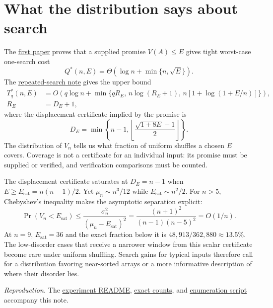 \documentclass[10pt,letterpaper]{article}
\begin{document}
\section*{What the distribution says about search}
The \href{../../disorder_potential_search_note_v2.pdf}{first paper} proves that
a supplied promise $V(A)\le E$ gives tight worst-case one-search cost
\[
 Q^*(n,E)=\Theta\!\left(\log n+\min\{n,\sqrt E\}\right).
\]
The \href{../../search-under-a-disorder-budget/search_under_a_disorder_budget.pdf}
{repeated-search note} gives the upper bound
\[
 \begin{aligned}
T_q^*(n,E)&=O\!\left(q\log n+
 \min\{qR_E,\,n\log(R_E+1),\,n[1+\log(1+E/n)]\}\right),\\
R_E&=D_E+1,
\end{aligned}
\]
where the displacement certificate implied by the promise is
\[
 D_E=\min\left\{n-1,
 \left\lfloor\frac{\sqrt{1+8E}-1}{2}\right\rfloor\right\}.
\]
The distribution of $V_n$ tells us what fraction of uniform shuffles a chosen
$E$ covers. Coverage is not a certificate for an individual input: its promise
must be supplied or verified, and verification comparisons must be counted.

The displacement certificate saturates at $D_E=n-1$ when
$E\ge E_{\mathrm{sat}}=n(n-1)/2$. Yet $\mu_n\sim n^3/12$ while
$E_{\mathrm{sat}}\sim n^2/2$. For $n>5$, Chebyshev's inequality makes the
asymptotic separation explicit:
\[
 \Pr(V_n<E_{\mathrm{sat}})
 \le \frac{\sigma_n^2}{(\mu_n-E_{\mathrm{sat}})^2}
 =\frac{(n+1)^2}{(n-1)(n-5)^2}=O(1/n).
\]
At $n=9$, $E_{\mathrm{sat}}=36$ and the exact fraction below it is
$48{,}913/362{,}880\approx13.5\%$. The low-disorder cases that receive a
narrower window from this scalar certificate become rare under uniform
shuffling. Search gains for typical inputs therefore call for a distribution
favoring near-sorted arrays or a more informative description of where their
disorder lies.

\smallskip
{\footnotesize\emph{Reproduction.} The
\href{README.md}{experiment README},
\href{potential_counts.csv}{exact counts}, and
\href{plot_potential_n9.py}{enumeration script} accompany this note.}
\end{document}
